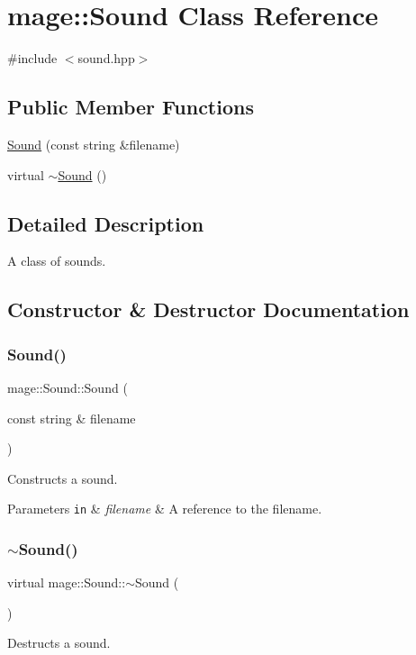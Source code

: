 \hypertarget{classmage_1_1_sound}{}\section{mage\+:\+:Sound Class Reference}
\label{classmage_1_1_sound}


{\ttfamily \#include $<$sound.\+hpp$>$}

\subsection*{Public Member Functions}
\begin{DoxyCompactItemize}
\item 
\hyperlink{classmage_1_1_sound_a2c2040be974e867affdf08790f113047}{Sound} (const string \&filename)
\item 
virtual \hyperlink{classmage_1_1_sound_a5d714a8c8528a5bebd49a28c38d08de3}{$\sim$\+Sound} ()
\end{DoxyCompactItemize}


\subsection{Detailed Description}
A class of sounds. 

\subsection{Constructor \& Destructor Documentation}
\hypertarget{classmage_1_1_sound_a2c2040be974e867affdf08790f113047}{}\label{classmage_1_1_sound_a2c2040be974e867affdf08790f113047} 
\subsubsection{\texorpdfstring{Sound()}{Sound()}}
{\footnotesize\ttfamily mage\+::\+Sound\+::\+Sound (\begin{DoxyParamCaption}\item[{const string \&}]{filename }\end{DoxyParamCaption})}

Constructs a sound.


\begin{DoxyParams}[1]{Parameters}
\mbox{\tt in}  & {\em filename} & A reference to the filename. \\
\hline
\end{DoxyParams}
\hypertarget{classmage_1_1_sound_a5d714a8c8528a5bebd49a28c38d08de3}{}\label{classmage_1_1_sound_a5d714a8c8528a5bebd49a28c38d08de3} 
\subsubsection{\texorpdfstring{$\sim$\+Sound()}{~Sound()}}
{\footnotesize\ttfamily virtual mage\+::\+Sound\+::$\sim$\+Sound (\begin{DoxyParamCaption}{ }\end{DoxyParamCaption})\hspace{0.3cm}{\ttfamily [virtual]}}

Destructs a sound. 